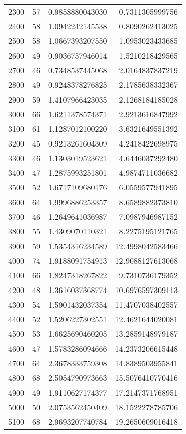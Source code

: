 \begin{longtable}{lrrr}
2300 & 57 & 0.9858880043030 & 0.7311305999756 \\
2400 & 58 & 1.0942242145538 & 0.8090262413025 \\
2500 & 58 & 1.0667393207550 & 1.0953023433685 \\
2600 & 49 & 0.9036757946014 & 1.5210218429565 \\
2700 & 46 & 0.7348537445068 & 2.0164837837219 \\
2800 & 49 & 0.9248378276825 & 2.1785638332367 \\
2900 & 59 & 1.4107966423035 & 2.1268184185028 \\
3000 & 66 & 1.6211378574371 & 2.9213616847992 \\
3100 & 61 & 1.1287012100220 & 3.6321649551392 \\
3200 & 45 & 0.9213261604309 & 4.2418422698975 \\
3300 & 46 & 1.1303019523621 & 4.6446037292480 \\
3400 & 47 & 1.2875993251801 & 4.9874711036682 \\
3500 & 52 & 1.6717109680176 & 6.0559577941895 \\
3600 & 64 & 1.9996886253357 & 8.6589882373810 \\
3700 & 46 & 1.2649641036987 & 7.0987946987152 \\
3800 & 55 & 1.4309070110321 & 8.2275195121765 \\
3900 & 59 & 1.5354316234589 & 12.4998042583466 \\
4000 & 74 & 1.9188091754913 & 12.9088127613068 \\
4100 & 66 & 1.8247318267822 & 9.7310736179352 \\
4200 & 48 & 1.3616037368774 & 10.6976597309113 \\
4300 & 54 & 1.5901432037354 & 11.4707038402557 \\
4400 & 52 & 1.5206227302551 & 12.4621644020081 \\
4500 & 53 & 1.6625690460205 & 13.2859148979187 \\
4600 & 47 & 1.5783286094666 & 14.2373206615448 \\
4700 & 64 & 2.3678333759308 & 14.8389503955841 \\
4800 & 68 & 2.5054790973663 & 15.5076410770416 \\
4900 & 49 & 1.9110627174377 & 17.2147371768951 \\
5000 & 50 & 2.0753562450409 & 18.1522278785706 \\
5100 & 68 & 2.9693207740784 & 19.2650609016418 \\
\end{longtable}
